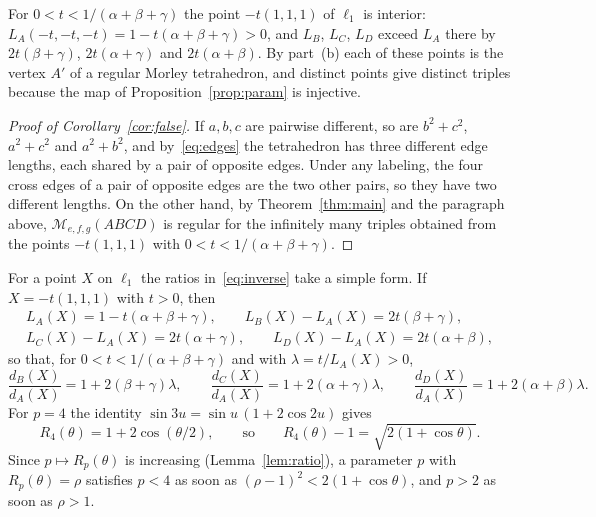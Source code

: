 \documentclass[11pt]{amsart}
\theoremstyle{definition}
\theoremstyle{remark}
\numberwithin{equation}{section}
\newcommand{\M}{\mathcal{M}}
\begin{document}
For $0<t<1/(\alpha+\beta+\gamma)$ the point $-t(1,1,1)$ of $\ell_1$ is interior: $L_A(-t,-t,-t)=1-t(\alpha+\beta+\gamma)>0$, and $L_B$, $L_C$, $L_D$ exceed $L_A$ there by $2t(\beta+\gamma)$, $2t(\alpha+\gamma)$ and $2t(\alpha+\beta)$. By part~(b) each of these points is the vertex $A'$ of a regular Morley tetrahedron, and distinct points give distinct triples because the map of Proposition~\ref{prop:param} is injective.

\begin{proof}[Proof of Corollary~\ref{cor:false}]
If $a,b,c$ are pairwise different, so are $b^2+c^2$, $a^2+c^2$ and $a^2+b^2$, and by~\eqref{eq:edges} the tetrahedron has three different edge lengths, each shared by a pair of opposite edges. Under any labeling, the four cross edges of a pair of opposite edges are the two other pairs, so they have two different lengths. On the other hand, by Theorem~\ref{thm:main} and the paragraph above, $\M_{e,f,g}(ABCD)$ is regular for the infinitely many triples obtained from the points $-t(1,1,1)$ with $0<t<1/(\alpha+\beta+\gamma)$.
\end{proof}

For a point $X$ on $\ell_1$ the ratios in~\eqref{eq:inverse} take a simple form. If $X=-t(1,1,1)$ with $t>0$, then
\begin{gather*}
L_A(X)=1-t(\alpha+\beta+\gamma),\qquad L_B(X)-L_A(X)=2t(\beta+\gamma),\\
L_C(X)-L_A(X)=2t(\alpha+\gamma),\qquad L_D(X)-L_A(X)=2t(\alpha+\beta),
\end{gather*}
so that, for $0<t<1/(\alpha+\beta+\gamma)$ and with $\lambda=t/L_A(X)>0$,
\begin{equation}\label{eq:l1ratios}
\frac{d_B(X)}{d_A(X)}=1+2(\beta+\gamma)\lambda,\qquad
\frac{d_C(X)}{d_A(X)}=1+2(\alpha+\gamma)\lambda,\qquad
\frac{d_D(X)}{d_A(X)}=1+2(\alpha+\beta)\lambda .
\end{equation}
For $p=4$ the identity $\sin3u=\sin u\,(1+2\cos 2u)$ gives
\begin{equation}\label{eq:R4}
R_4(\theta)=1+2\cos(\theta/2),\qquad\text{so}\qquad R_4(\theta)-1=\sqrt{2(1+\cos\theta)} .
\end{equation}
Since $p\mapsto R_p(\theta)$ is increasing (Lemma~\ref{lem:ratio}), a parameter $p$ with $R_p(\theta)=\rho$ satisfies $p<4$ as soon as $(\rho-1)^2<2(1+\cos\theta)$, and $p>2$ as soon as $\rho>1$.
\end{document}
